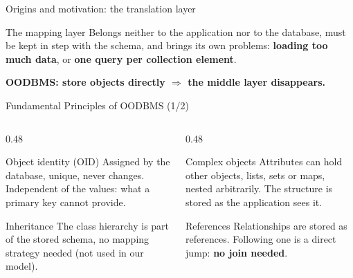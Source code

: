 \documentclass{beamer}
\begin{document}
\begin{frame}{Origins and motivation: the translation layer}
    \vspace{0.2em}
    \begin{block}{The mapping layer}
        \small
        Belongs neither to the application nor to the database, must be kept in step with the schema,
        and brings its own problems: \textbf{loading too much data}, or \textbf{one query per collection element}.
    \end{block}

    \begin{center}
        \textbf{OODBMS: store objects directly $\Rightarrow$ the middle layer disappears.}
    \end{center}
\end{frame}

\begin{frame}{Fundamental Principles of OODBMS (1/2)}
    \small
    \begin{columns}[T]
        \begin{column}{0.48\textwidth}
            \begin{block}{Object identity (OID)}
                Assigned by the database, unique, never changes.
                Independent of the values: what a primary key cannot provide.
            \end{block}
            \begin{block}{Inheritance}
                The class hierarchy is part of the stored schema, no mapping strategy needed
                (not used in our model).
            \end{block}
        \end{column}
        \begin{column}{0.48\textwidth}
            \begin{block}{Complex objects}
                Attributes can hold other objects, lists, sets or maps, nested arbitrarily.
                The structure is stored as the application sees it.
            \end{block}
            \begin{block}{References}
                Relationships are stored as references. Following one is a direct jump:
                \textbf{no join needed}.
            \end{block}
        \end{column}
    \end{columns}
\end{frame}
\end{document}
